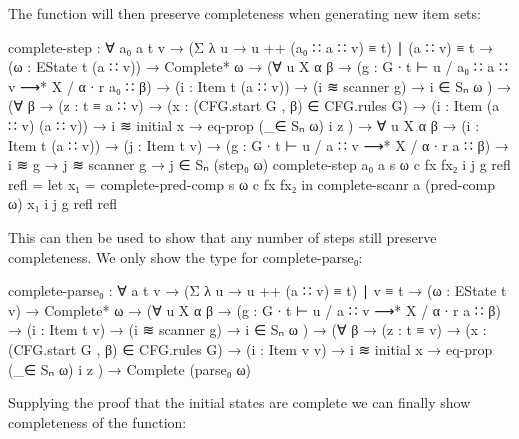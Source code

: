		The  function will then preserve completeness when
		generating new item sets:

		\begin{code}
			  complete-step : ∀ {a₀ a t v} →
			    (Σ λ u → u ++ (a₀ ∷ a ∷ v) ≡ t) ∣ (a ∷ v) ≡ t →
			    (ω : EState t (a ∷ v)) →
			    Complete* ω →
			    (∀ {u X α β} →
			      (g : G ∙ t ⊢ u / a₀ ∷ a ∷ v ⟶* X / α ∙ r a₀ ∷ β) →
			      (i : Item t (a ∷ v)) → (i ≋ scanner g) →
			      i ∈ Sₙ ω
			    ) →
			    (∀ {β} →
			      (z : t ≡ a ∷ v) →
			      (x : (CFG.start G , β) ∈ CFG.rules G) →
			      (i : Item (a ∷ v) (a ∷ v)) →
			      i ≋ initial x → eq-prop (_∈ Sₙ ω) i z
			    ) →
			    ∀ {u X α β} →
			    (i : Item t (a ∷ v)) →
			    (j : Item t v) →
			    (g : G ∙ t ⊢ u / a ∷ v ⟶* X / α ∙ r a ∷ β) →
			    i ≋ g →
			    j ≋ scanner g →
			      j ∈ Sₙ (step₀ ω)
			  complete-step {a₀} {a} s ω c fx fx₂ i j g refl refl =
			    let
			      x₁ = complete-pred-comp s ω c fx fx₂
			    in complete-scanr a (pred-comp ω) x₁ i j g refl refl
		\end{code}

		This can then be used to show that any number of steps still preserve
		completeness. We only show the type for complete-parse₀:

		\begin{code}
			  complete-parse₀ : ∀ {a t v} →
			    (Σ λ u → u ++ (a ∷ v) ≡ t) ∣ v ≡ t →
			    (ω : EState t v) →
			    Complete* ω →
			    (∀ {u X α β} →
			      (g : G ∙ t ⊢ u / a ∷ v ⟶* X / α ∙ r a ∷ β) →
			      (i : Item t v) → (i ≋ scanner g) →
			      i ∈ Sₙ ω
			    ) →
			    (∀ {β} →
			      (z : t ≡ v) →
			      (x : (CFG.start G , β) ∈ CFG.rules G) →
			      (i : Item v v) →
			      i ≋ initial x → eq-prop (_∈ Sₙ ω) i z
			    ) →
			    Complete (parse₀ ω)
		\end{code}

		Supplying the proof that the initial states are complete we can finally
		show completeness of the  function:


